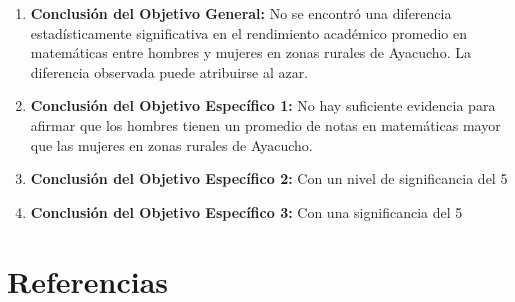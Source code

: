 \documentclass[
]{article}
\begin{document}
\begin{enumerate}
  \item \textbf{Conclusión del Objetivo General:}
    No se encontró una diferencia estadísticamente significativa en el rendimiento académico promedio en matemáticas entre hombres y mujeres en zonas rurales de Ayacucho. La diferencia observada puede atribuirse al azar.
    
  \item \textbf{Conclusión del Objetivo Específico 1:}
    No hay suficiente evidencia para afirmar que los hombres tienen un promedio de notas en matemáticas mayor que las mujeres en zonas rurales de Ayacucho.
    
  \item \textbf{Conclusión del Objetivo Específico 2:}
    Con un nivel de significancia del 5%
    
  \item \textbf{Conclusión del Objetivo Específico 3:}
    Con una significancia del 5%
\end{enumerate}

\newpage

\section*{Referencias}\label{referencias}
\end{document}
